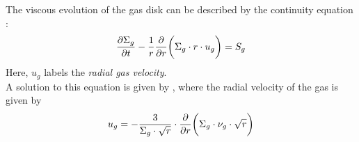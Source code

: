 
        The viscous evolution of the gas disk can be described by the continuity equation 
        \cite{birnstiel_dullemond_brauer_2010}:
        \begin{equation}
            \frac{\partial \Sigma_g}{\partial t}-\frac{1}{r}\frac{\partial }{\partial r}\bigg(\Sigma_g \cdot r \cdot u_g\bigg) = S_g
        \end{equation}
        Here, $u_g$ labels the \textit{radial gas velocity}.
        \\

        A solution to this equation is given by \cite{lynden-bell_pringle_1974}, where the 
        radial velocity of the gas is given by
        \begin{equation}
            \label{eq:radial_gas_velocity}
            u_{g}
            =-\frac{3}{\Sigma_g\cdot\sqrt{r}}
                \cdot\frac{\partial }{\partial r}\bigg(\Sigma_g \cdot \nu_g \cdot \sqrt{r}\bigg)
        \end{equation}



